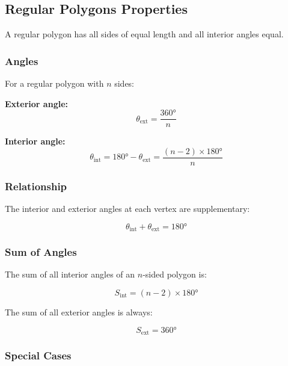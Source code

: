 \subsection{Regular Polygons Properties}

A regular polygon has all sides of equal length and all interior angles equal.

\subsubsection{Angles}

For a regular polygon with $n$ sides:

\textbf{Exterior angle:}
\begin{equation}
    \theta_{\text{ext}} = \frac{360°}{n}
\end{equation}

\textbf{Interior angle:}
\begin{equation}
    \theta_{\text{int}} = 180° - \theta_{\text{ext}} = \frac{(n-2) \times 180°}{n}
\end{equation}

\subsubsection{Relationship}

The interior and exterior angles at each vertex are supplementary:

\begin{equation}
    \theta_{\text{int}} + \theta_{\text{ext}} = 180°
\end{equation}

\subsubsection{Sum of Angles}

The sum of all interior angles of an $n$-sided polygon is:

\begin{equation}
    S_{\text{int}} = (n-2) \times 180°
\end{equation}

The sum of all exterior angles is always:

\begin{equation}
    S_{\text{ext}} = 360°
\end{equation}

\subsubsection{Special Cases}

